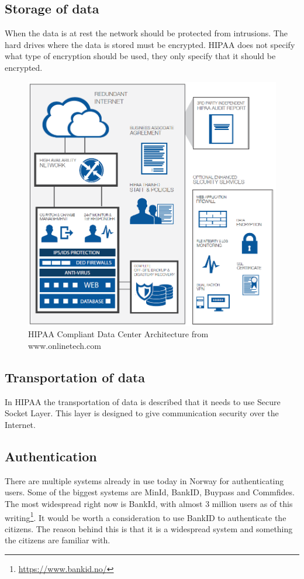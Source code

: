 \subsection{Storage of data}
When the data is at rest the network should be protected from intrusions.
The hard drives where the data is stored must be encrypted. \cite{Encryption}
HIPAA does not specify what type of encryption should be used, they only specify that it should be encrypted.

\begin{figure}[H]
\centering
\includegraphics[scale=0.50]{../Figures/hipaa.png}
\caption{HIPAA Compliant Data Center Architecture from www.onlinetech.com}
\label{figure:HIPAA}
\end{figure}

\subsection{Transportation of data}
In HIPAA the transportation of data is described that it needs to use Secure Socket Layer. 
This layer is designed to give communication security over the Internet. \cite{SSL}

\subsection{Authentication}
There are multiple systems already in use today in Norway for authenticating users. 
Some of the biggest systems are MinId, BankID, Buypass and Commfides.
The most widespread right now is BankId, with almost 3 million users as of this writing\footnote{\href{https://www.bankid.no/}{https://www.bankid.no/}}.
It would be worth a consideration to use BankID to authenticate the citizens. 
The reason behind this is that it is a widespread system and something the citizens are familiar with. 

